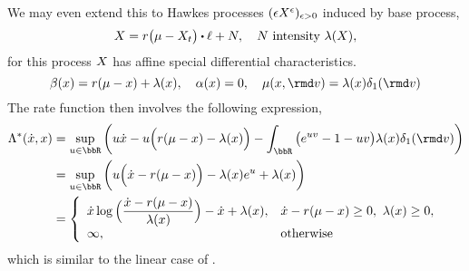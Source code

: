 \begin{example}
  We may even extend this to Hawkes processes $(\epsilon X^\epsilon)_{\epsilon>0}$ induced by base process,
  \begin{equation*}
    \X = \hawkesRate\big(\mu- \X_t \big) \shortInt \leb + \N, \quad \N \text{ intensity } \affInt(\X),
  \end{equation*}
  for this process $X$ has affine special differential characteristics.
  \begin{equation*}
    \affDrift(\stateVar) = \hawkesRate(\mu - \stateVar) + \affInt(\stateVar), \quad
    \affDiff(\stateVar) = 0, \quad
    \affJump(\stateVar, \rmd\markVar) = \affInt(\stateVar) \delta_1(\rmd\markVar)
  \end{equation*}
  The rate function then involves the following expression,
  \begin{align*}
    \ode^*(\diffVar, \stateVar) 
    &= \sup_{\momentVar\in\bbR} \bigg( \momentVar\diffVar - \momentVar\Big(\hawkesRate(\mu - \stateVar) - \affInt(\stateVar)\Big) - \int_\bbR \big( e^{\momentVar\markVar} - 1 - \momentVar\markVar \big) \affInt(\stateVar) \delta_1(\rmd\markVar) \bigg) \\
    &= \sup_{\momentVar\in\bbR} \bigg( \momentVar\Big(\diffVar - \hawkesRate(\mu-\stateVar)\Big) - \affInt(\stateVar)e^\momentVar + \affInt(\stateVar) \bigg) \\
    &= \left\{\begin{array}{ll}
      \displaystyle \diffVar \log\Big(\frac{\diffVar-\hawkesRate(\mu-\stateVar)}{\affInt(\stateVar)}\Big) - \diffVar + \affInt(\stateVar), & \diffVar - \hawkesRate(\mu-\stateVar) \geq 0, ~ \affInt(\stateVar) \geq 0, \\
      \infty, & \text{otherwise}
    \end{array}\right.
  \end{align*}
  which is similar to the linear case of \cite{Gao2018b}.
\end{example}
